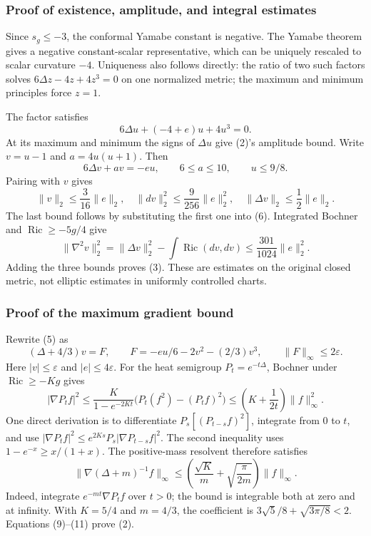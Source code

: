 \documentclass[
  11pt,
]{article}
\begin{document}
\hypertarget{proof-of-existence-amplitude-and-integral-estimates}{%
\subsubsection{Proof of existence, amplitude, and integral
estimates}\label{proof-of-existence-amplitude-and-integral-estimates}}

Since \(s_g\le-3\), the conformal Yamabe constant is negative. The
Yamabe theorem gives a negative constant-scalar representative, which
can be uniquely rescaled to scalar curvature \(-4\). Uniqueness also
follows directly: the ratio of two such factors solves
\(6\Delta z-4z+4z^3=0\) on one normalized metric; the maximum and
minimum principles force \(z=1\).

The factor satisfies \[
 6\Delta u+(-4+e)u+4u^3=0.
 \tag{5}
\] At its maximum and minimum the signs of \(\Delta u\) give (2)'s
amplitude bound. Write \(v=u-1\) and \(a=4u(u+1)\). Then \[
 6\Delta v+av=-eu,\qquad
 6\le a\le10,\qquad u\le9/8.
 \tag{6}
\] Pairing with \(v\) gives \[
 \|v\|_2\le\frac3{16}\|e\|_2,
 \quad \|dv\|_2^2\le\frac9{256}\|e\|_2^2,
 \quad \|\Delta v\|_2\le\frac12\|e\|_2.
 \tag{7}
\] The last bound follows by substituting the first one into (6).
Integrated Bochner and \(\operatorname{Ric}\ge-5g/4\) give \[
 \|\nabla^2v\|_2^2
 =\|\Delta v\|_2^2-\int\operatorname{Ric}(dv,dv)
 \le\frac{301}{1024}\|e\|_2^2.
 \tag{8}
\] Adding the three bounds proves (3). These are estimates on the
original closed metric, not elliptic estimates in uniformly controlled
charts.

\hypertarget{proof-of-the-maximum-gradient-bound}{%
\subsubsection{Proof of the maximum gradient
bound}\label{proof-of-the-maximum-gradient-bound}}

Rewrite (5) as \[
 (\Delta+4/3)v=F,
 \qquad F=-eu/6-2v^2-(2/3)v^3,
 \qquad \|F\|_\infty\le2\varepsilon.
 \tag{9}
\] Here \(|v|\le\varepsilon\) and \(|e|\le4\varepsilon\). For the heat
semigroup \(P_t=e^{-t\Delta}\), Bochner under
\(\operatorname{Ric}\ge-Kg\) gives \[
 |\nabla P_t f|^2
 \le\frac{K}{1-e^{-2Kt}}
       \bigl(P_t(f^2)-(P_tf)^2\bigr)
 \le\left(K+\frac1{2t}\right)\|f\|_\infty^2.
 \tag{10}
\] One direct derivation is to differentiate \(P_s[(P_{t-s}f)^2]\),
integrate from \(0\) to \(t\), and use
\(|\nabla P_t f|^2\le e^{2Ks}P_s|\nabla P_{t-s}f|^2\). The second
inequality uses \(1-e^{-x}\ge x/(1+x)\). The positive-mass resolvent
therefore satisfies \[
 \|\nabla(\Delta+m)^{-1}f\|_\infty
 \le\left(\frac{\sqrt K}{m}+\sqrt{\frac\pi{2m}}\right)\|f\|_\infty.
 \tag{11}
\] Indeed, integrate \(e^{-mt}\nabla P_tf\) over \(t>0\); the bound is
integrable both at zero and at infinity. With \(K=5/4\) and \(m=4/3\),
the coefficient is \(3\sqrt5/8+\sqrt{3\pi/8}<2\). Equations (9)--(11)
prove (2).
\end{document}
